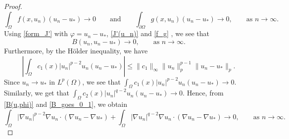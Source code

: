 \documentclass[pdflatex,sn-mathphys-num]{sn-jnl}
\theoremstyle{thmstyleone}%
\theoremstyle{thmstyletwo}%
\theoremstyle{thmstylethree}%
\theoremstyle{thmstylethree}%
\begin{document}
\begin{proof}
\begin{equation}\label{f_g}
\int_\Omega f(x, u_n) (u_n-u_*)  \to 0 \qquad \text{and} \qquad      \int_{\partial\Omega} g(x, u_n) (u_n-u_*)  \to 0 ,\qquad \text{as $n\to \infty$}.
 \end{equation}    Using \eqref{form_J'} with $\varphi=u_n-u_*$, \eqref{J'(u_n)} and  \eqref{f_g} , we see that
     \begin{equation}\label{B_goes_0_1}
         B(u_n, u_n-u_*) \to 0,\qquad \text{as $n\to \infty$}.
     \end{equation}
Furthermore,     by the Hölder inequality, we have
     \begin{equation*}
  \left|       \int_\Omega c_1(x) |u_n|^{p-2}u_n(u_n-u_*)  \right| 
  \leqslant \|c_1\|_\infty\|u_n\|_p^{p-1}\|u_n-u_*\|_p
.     \end{equation*}
Since  $u_n \to u_*$ in $L^p(\Omega)$, we see that $\displaystyle \int_\Omega c_1(x)|u_n|^{p-2}u_n(u_n-u_*)  \to 0$. Similarly, we get that
$\displaystyle \int_\Omega c_2(x)|u_n|^{q-2}u_n(u_n-u_*)  \to 0$. Hence, from \eqref{B(u,phi)} and \eqref{B_goes_0_1}, we obtain
\begin{equation}\label{grad(u_n-u)_1}
    \int_\Omega |\nabla u_n|^{p-2} \nabla u_n \cdot (\nabla u_n-\nabla u_*)  +     \int_\Omega |\nabla u_n|^{q-2} \nabla u_n \cdot (\nabla u_n-\nabla u_*)  \to 0, \qquad \text{as }n\to \infty.
\end{equation}


\end{proof}
\end{document}
